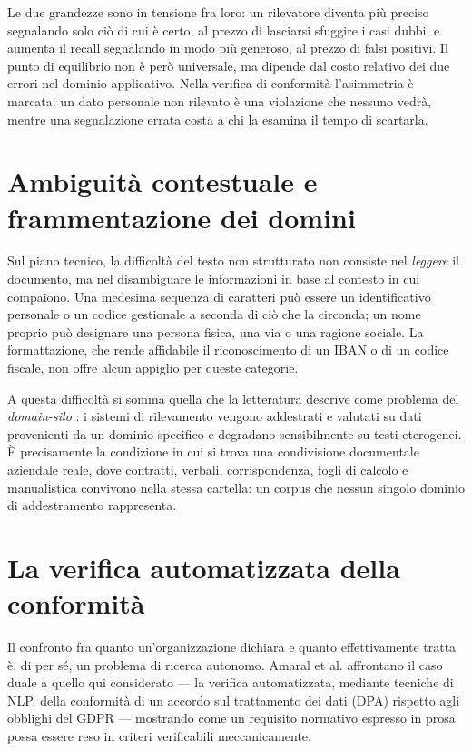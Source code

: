 Le due grandezze sono in tensione fra loro: un rilevatore diventa più preciso segnalando solo ciò di cui è certo, al prezzo di lasciarsi sfuggire i casi dubbi, e aumenta il recall segnalando in modo più generoso, al prezzo di falsi positivi. Il punto di equilibrio non è però universale, ma dipende dal costo relativo dei due errori nel dominio applicativo. Nella verifica di conformità l'asimmetria è marcata: un dato personale non rilevato è una violazione che nessuno vedrà, mentre una segnalazione errata costa a chi la esamina il tempo di scartarla.

\section{Ambiguità contestuale e frammentazione dei domini} %
\label{sub:ambiguita-contestuale}
Sul piano tecnico, la difficoltà del testo non strutturato non consiste nel \emph{leggere} il documento, ma nel disambiguare le informazioni in base al contesto in cui compaiono. Una medesima sequenza di caratteri può essere un identificativo personale o un codice gestionale a seconda di ciò che la circonda; un nome proprio può designare una persona fisica, una via o una ragione sociale. La formattazione, che rende affidabile il riconoscimento di un IBAN o di un codice fiscale, non offre alcun appiglio per queste categorie. \medskip

A questa difficoltà si somma quella che la letteratura descrive come problema del \textit{domain-silo} \cite{jhaPIIBenchUnifiedMultiSource2026}: i sistemi di rilevamento vengono addestrati e valutati su dati provenienti da un dominio specifico e degradano sensibilmente su testi eterogenei. È precisamente la condizione in cui si trova una condivisione documentale aziendale reale, dove contratti, verbali, corrispondenza, fogli di calcolo e manualistica convivono nella stessa cartella: un corpus che nessun singolo dominio di addestramento rappresenta.

\section{La verifica automatizzata della conformità} %
\label{sub:compliance-checking}
Il confronto fra quanto un'organizzazione dichiara e quanto effettivamente tratta è, di per sé, un problema di ricerca autonomo. Amaral et al. \cite{amaralNLPbasedAutomatedCompliance2023} affrontano il caso duale a quello qui considerato --- la verifica automatizzata, mediante tecniche di NLP, della conformità di un accordo sul trattamento dei dati (DPA) rispetto agli obblighi del GDPR --- mostrando come un requisito normativo espresso in prosa possa essere reso in criteri verificabili meccanicamente. \medskip

